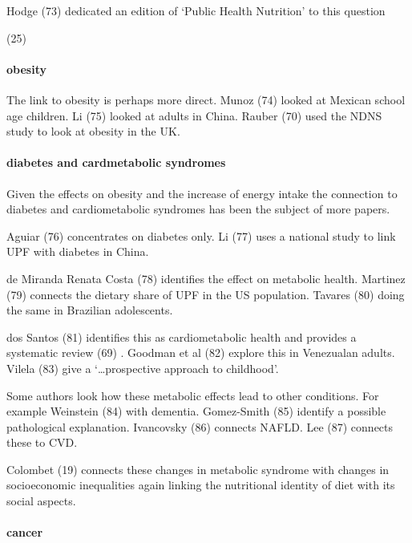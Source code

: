 \documentclass[
]{article}
\begin{document}
Hodge (73) dedicated an edition of `Public Health Nutrition' to this
question

(25)

\hypertarget{obesity}{%
\paragraph{obesity}\label{obesity}}

The link to obesity is perhaps more direct. Munoz (74) looked at Mexican
school age children. Li (75) looked at adults in China. Rauber (70) used
the NDNS study to look at obesity in the UK.

\hypertarget{diabetes-and-cardmetabolic-syndromes}{%
\paragraph{diabetes and cardmetabolic
syndromes}\label{diabetes-and-cardmetabolic-syndromes}}

Given the effects on obesity and the increase of energy intake the
connection to diabetes and cardiometabolic syndromes has been the
subject of more papers.

Aguiar (76) concentrates on diabetes only. Li (77) uses a national study
to link UPF with diabetes in China.

de Miranda Renata Costa (78) identifies the effect on metabolic health.
Martinez (79) connects the dietary share of UPF in the US population.
Tavares (80) doing the same in Brazilian adolescents.

dos Santos (81) identifies this as cardiometabolic health and provides a
systematic review (69) . Goodman et al (82) explore this in Venezualan
adults. Vilela (83) give a `\ldots prospective approach to childhood'.

Some authors look how these metabolic effects lead to other conditions.
For example Weinstein (84) with dementia. Gomez-Smith (85) identify a
possible pathological explanation. Ivancovsky (86) connects NAFLD. Lee
(87) connects these to CVD.

Colombet (19) connects these changes in metabolic syndrome with changes
in socioeconomic inequalities again linking the nutritional identity of
diet with its social aspects.

\hypertarget{cancer}{%
\paragraph{cancer}\label{cancer}}
\end{document}
